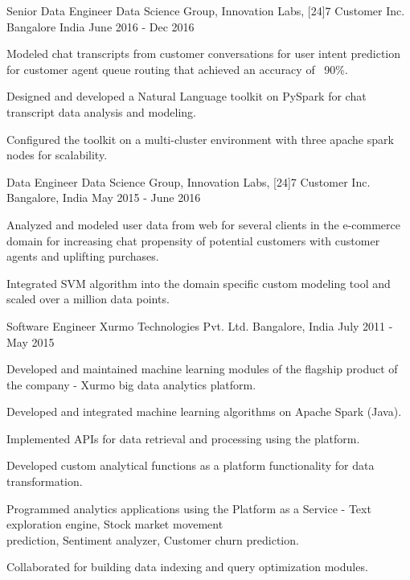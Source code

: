 \begin{cventries}
  \cventry
    {Senior Data Engineer}
    {Data Science Group, Innovation Labs, [24]7 Customer Inc.}
    {Bangalore India}
    {June 2016 - Dec 2016}
    {
      \begin{cvitems}
        \item {Modeled chat transcripts from customer conversations for user intent prediction for customer agent queue routing that achieved an accuracy of ~90\%.}
        \item {Designed and developed a Natural Language toolkit on PySpark for chat transcript data analysis and modeling.}
        \item {Configured the toolkit on a multi-cluster environment with three apache spark nodes for scalability.}
      \end{cvitems}
    }
  \cventry
    {Data Engineer}
    {Data Science Group, Innovation Labs, [24]7 Customer Inc.}  
    {Bangalore, India}
    {May 2015 - June 2016}
    {
      \begin{cvitems}
        \item {Analyzed and modeled user data from web for several clients in the e-commerce domain for increasing chat propensity of potential customers with customer agents and uplifting purchases.}
        \item {Integrated SVM algorithm into the domain specific custom modeling tool and scaled over a million data points.}
      \end{cvitems}
    }
  \cventry
    {Software Engineer}
    {Xurmo Technologies Pvt. Ltd.}
    {Bangalore, India}
    {July 2011 - May 2015}
    {
      \begin{cvitems}
        \item {Developed and maintained machine learning modules of the flagship product of the company - Xurmo big data analytics platform.}
        \item {Developed and integrated machine learning algorithms on Apache Spark (Java).}
        \item {Implemented APIs for data retrieval and processing using the platform.}
        \item {Developed custom analytical functions as a platform functionality for data transformation.}
        \item {Programmed analytics applications using the Platform as a Service - Text exploration engine, Stock market movement \\ prediction, Sentiment analyzer, Customer churn prediction.}
        \item {Collaborated for building data indexing and query optimization modules.}
      \end{cvitems} 
    }
\end{cventries}
